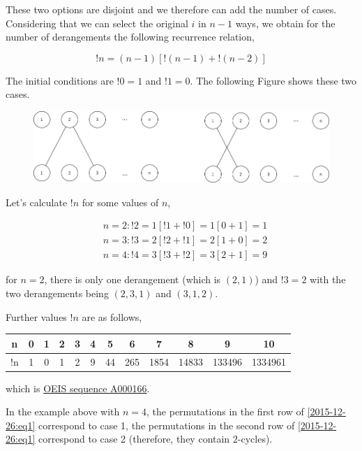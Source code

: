 These two options are disjoint and we therefore can add the number of cases. Considering that we can select the original $i$ in $n-1$ ways, we obtain for the number of derangements the following recurrence relation,

\begin{equation}
\label{2015-12-26:eq2}
!n = (n-1) \left[ !(n-1) +  !(n-2)\right]
\end{equation}

The initial conditions are $!0=1$ and $!1=0$. The following Figure shows these two cases.

\begin{figure}[H]
    \includegraphics[scale=0.5]{images/2015-12-26-permutations_02_01.png}
\end{figure}

Let's calculate $!n$ for some values of $n$,

\begin{align*}
  &n=2: !2 = 1 [!1 + !0] = 1 [0 + 1] = 1 \\
  &n=3: !3 = 2 [!2 + !1] = 2 [1 + 0] = 2 \\
  &n=4: !4 = 3 [!3 + !2] = 3 [2 + 1] = 9
\end{align*}

for $n=2$, there is only one derangement (which is $(2,1)$) and $!3 = 2$ with the two derangements being $(2,3,1)$ and $(3,1,2)$.

Further values $!n$ are as follows,

\vspace*{2mm}

\begin{tabular}{c|ccccccccccc}
  n &  0 & 1 & 2 & 3 & 4 &  5 &   6 &   7 &     8 & 9 &           10 \\ \hline
  !n & 1 & 0 & 1 & 2 & 9 & 44 & 265 &1854 & 14833 & 133496 & 1334961 \\
\end{tabular}

\vspace*{2mm}

which is \href{https://oeis.org/A000166}{OEIS sequence A000166}.

In the example above with $n=4$, the permutations in the first row of \eqref{2015-12-26:eq1} correspond to case 1, the permutations in the second row of \eqref{2015-12-26:eq1} correspond to case 2 (therefore, they contain $2$-cycles).


